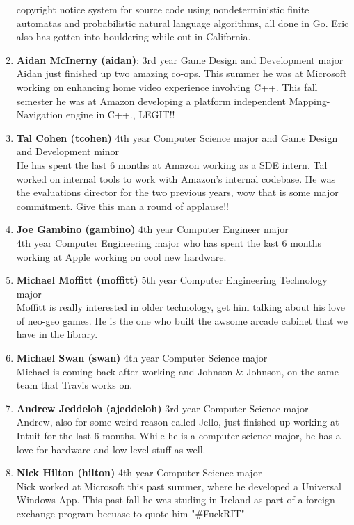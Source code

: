 \documentclass[9pt]{extarticle}
\begin{document}
\begin{enumerate}
	copyright notice system for source code using nondeterministic finite 
	automatas and probabilistic natural language algorithms, all done in Go. 
	Eric also has gotten into bouldering while out in California. 
\\
\item \textbf{Aidan McInerny (aidan)}: 3rd year Game Design and Development major \\
	Aidan just finished up two amazing co-ops. This summer he was
	at Microsoft working on enhancing home video experience involving C++. 
	This fall semester he was at Amazon developing a platform independent 
	Mapping-Navigation engine in C++., LEGIT!!
\\
\item \textbf{Tal Cohen (tcohen)} 4th year Computer Science major and Game Design and Development minor \\
	He has spent the last 6 months at Amazon working as a SDE intern. Tal worked
	on internal tools to work with Amazon's internal codebase. He was the 
	evaluations director for the two previous years, wow that is some major 
	commitment. Give this man a round of applause!!
\\
\item \textbf{Joe Gambino (gambino)} 4th year Computer Engineer major \\
	4th year Computer Engineering major who	has spent the last 6 months
	working at Apple working on cool new hardware.
\\
\item \textbf{Michael Moffitt (moffitt)} 5th year Computer Engineering Technology major \\
    Moffitt is really interested in older technology, get him talking about 
    his love of neo-geo games. He is the one who built the awsome arcade 
    cabinet that we have in the library.
\\
\item \textbf{Michael Swan (swan)} 4th year Computer Science major \\
    Michael is coming back after working and Johnson \& Johnson, on the same
    team that Travis works on.
\\
\item \textbf{Andrew Jeddeloh (ajeddeloh)} 3rd year Computer Science major \\
    Andrew, also for some weird reason called Jello, just finished up working
    at Intuit for the last 6 months. While he is a computer science major,
    he has a love for hardware and low level stuff as well.
\\
\item \textbf{Nick Hilton (hilton)} 4th year Computer Science major \\
    Nick worked at Microsoft this past summer, where he developed a Universal
    Windows App. This past fall he was studing in Ireland as part of a foreign exchange 
    program becuase to quote him "\#FuckRIT"
\\
\end{enumerate}
\end{document}
